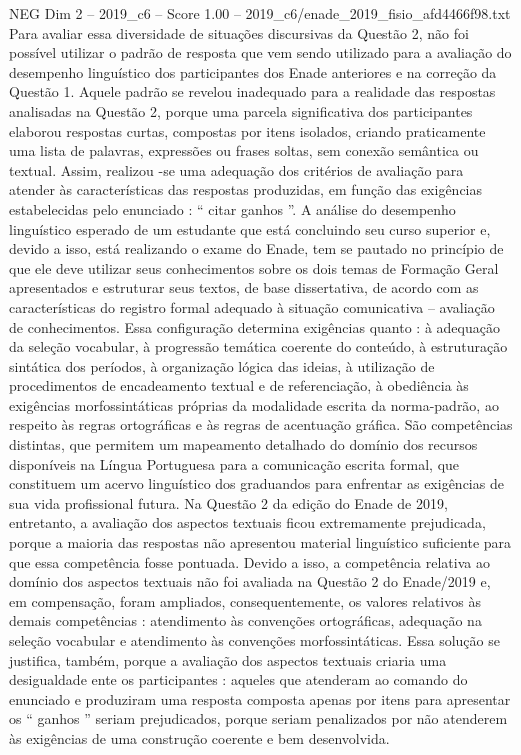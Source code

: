 \begin{textsample}{NEG Dim 2 – 2019\_c6 – Score 1.00 – 2019\_c6/enade\_2019\_fisio\_afd4466f98.txt}
Para avaliar essa diversidade de situações discursivas da Questão 2, não foi possível utilizar o padrão de resposta que vem sendo utilizado para a avaliação do desempenho linguístico dos participantes dos Enade anteriores e na correção da Questão 1.
Aquele padrão se revelou inadequado para a realidade das respostas analisadas na Questão 2, porque uma parcela significativa dos participantes elaborou respostas curtas, compostas por itens isolados, criando praticamente uma lista de palavras, expressões ou frases soltas, sem conexão semântica ou textual.
Assim, realizou -se uma adequação dos critérios de avaliação para atender às características das respostas produzidas, em função das exigências estabelecidas pelo enunciado : “ citar ganhos ”.
A análise do desempenho linguístico esperado de um estudante que está concluindo seu curso superior e, devido a isso, está realizando o exame do Enade, tem se pautado no princípio de que ele deve utilizar seus conhecimentos sobre os dois temas de Formação Geral apresentados e estruturar seus textos, de base dissertativa, de acordo com as características do registro formal adequado à situação comunicativa – avaliação de conhecimentos.
Essa configuração determina exigências quanto : à adequação da seleção vocabular, à progressão temática coerente do conteúdo, à estruturação sintática dos períodos, à organização lógica das ideias, à utilização de procedimentos de encadeamento textual e de referenciação, à obediência às exigências morfossintáticas próprias da modalidade escrita da norma-padrão, ao respeito às regras ortográficas e às regras de acentuação gráfica.
São competências distintas, que permitem um mapeamento detalhado do domínio dos recursos disponíveis na Língua Portuguesa para a comunicação escrita formal, que constituem um acervo linguístico dos graduandos para enfrentar as exigências de sua vida profissional futura.
Na Questão 2 da edição do Enade de 2019, entretanto, a avaliação dos aspectos textuais ficou extremamente prejudicada, porque a maioria das respostas não apresentou material linguístico suficiente para que essa competência fosse pontuada.
Devido a isso, a competência relativa ao domínio dos aspectos textuais não foi avaliada na Questão 2 do Enade/2019 e, em compensação, foram ampliados, consequentemente, os valores relativos às demais competências : atendimento às convenções ortográficas, adequação na seleção vocabular e atendimento às convenções morfossintáticas.
Essa solução se justifica, também, porque a avaliação dos aspectos textuais criaria uma desigualdade ente os participantes : aqueles que atenderam ao comando do enunciado e produziram uma resposta composta apenas por itens para apresentar os “ ganhos ” seriam prejudicados, porque seriam penalizados por não atenderem às exigências de uma construção coerente e bem desenvolvida.

\end{textsample}
